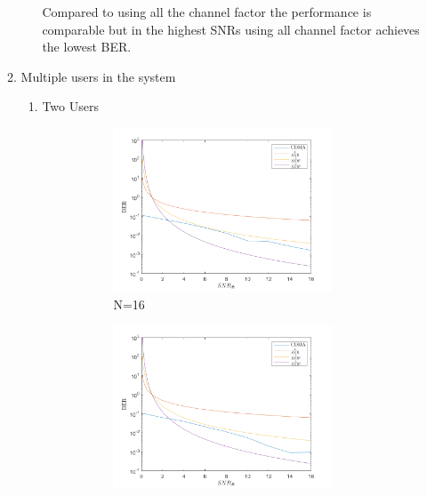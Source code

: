 \documentclass[12pt]{article}
\begin{document}
\begin{enumerate}
\begin{enumerate}
\begin{enumerate}
					Compared to using all the channel factor the performance is comparable but in the highest SNRs using all channel factor achieves the lowest BER. 
					\end{enumerate}
					
					\newpage
					\item Multiple users in the system
					\begin{enumerate}
						\item Two Users
							\begin{figure}[h!]
								\centering
								\begin{subfigure}[b]{0.4\textwidth}
									\centering
									\includegraphics[width=0.9\textwidth]{fig3.png}
									\caption{N=16}
								\end{subfigure}
								\begin{subfigure}[b]{0.4\textwidth}
									\centering
									\includegraphics[width=0.9\textwidth]{fig4.png}

\end{subfigure}
\end{figure}
\end{enumerate}
\end{enumerate}
\end{enumerate}
\end{document}
